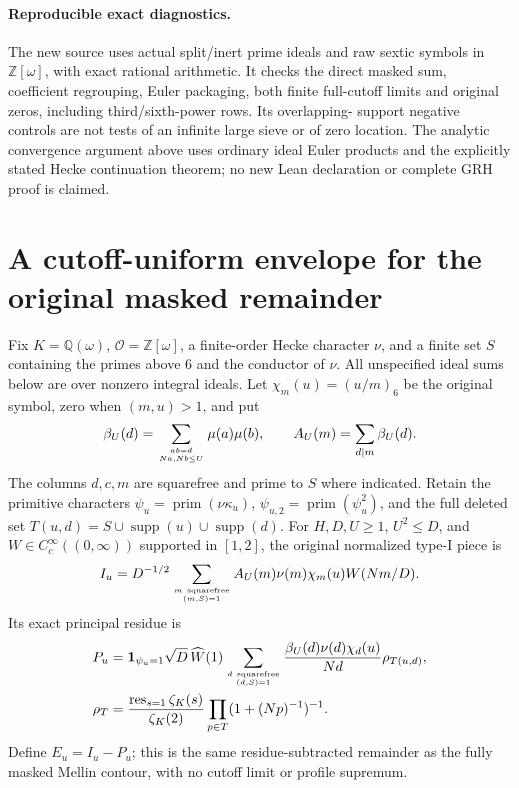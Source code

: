 \documentclass[11pt]{article}
\theoremstyle{definition}\newtheorem{definition}[theorem]{Definition}
\theoremstyle{remark}\newtheorem{remark}[theorem]{Remark}
\begin{document}
\paragraph{Reproducible exact diagnostics.}
The new source 
uses actual split/inert prime ideals and raw sextic symbols in
$\mathbb Z[\omega]$, with exact rational arithmetic. It checks the direct
masked sum, coefficient regrouping, Euler packaging, both finite full-cutoff
limits and original zeros, including third/sixth-power rows. Its overlapping-
support negative controls are not tests of an infinite large sieve or of
zero location. The analytic convergence argument above uses ordinary ideal
Euler products and the explicitly stated Hecke continuation theorem; no
new Lean declaration or complete GRH proof is claimed.

\section{A cutoff-uniform envelope for the original masked remainder}
\label{wc:core}
Fix $K=\mathbb Q(\omega)$, $\mathcal O=\mathbb Z[\omega]$, a finite-order
Hecke character $\nu$, and a finite set $S$ containing the primes above $6$
and the conductor of $\nu$. All unspecified ideal sums below are over
nonzero integral ideals. Let $\chi_m(u)=(u/m)_6$ be the original symbol,
zero when $(m,u)>1$, and put
\[
 \beta_U(d)=\sum_{ab=d\atop Na,Nb\le U}\mu(a)\mu(b),\qquad
 A_U(m)=\sum_{d\mid m}\beta_U(d).
\]
The columns $d,c,m$ are squarefree and prime to $S$ where indicated.
Retain the primitive characters $\psi_u=\operatorname{prim}(\nu\kappa_u)$,
$\psi_{u,2}=\operatorname{prim}(\psi_u^2)$, and the full deleted set
$T(u,d)=S\cup\operatorname{supp}(u)\cup\operatorname{supp}(d)$.
For $H,D,U\ge1$, $U^2\le D$, and $W\in C_c^\infty((0,\infty))$
supported in $[1,2]$, the original normalized type-I piece is
\begin{equation}\label{wc:polynomial}
 I_u=D^{-1/2}\sum_{m\ \mathrm{squarefree}\atop(m,S)=1}
     A_U(m)\nu(m)\chi_m(u)W(Nm/D).
\end{equation}
Its exact principal residue is
\begin{align}\label{wc:principal}
 P_u&=\mathbf1_{\psi_u=1}\sqrt D\,\widehat W(1)
 \sum_{d\ \mathrm{squarefree}\atop(d,S)=1}
 \frac{\beta_U(d)\nu(d)\chi_d(u)}{Nd}\rho_{T(u,d)},\notag\\
 \rho_T&=\frac{\operatorname*{res}_{s=1}\zeta_K(s)}{\zeta_K(2)}
               \prod_{p\in T}(1+(Np)^{-1})^{-1}.
\end{align}
Define $E_u=I_u-P_u$; this is the same residue-subtracted remainder as the
fully masked Mellin contour, with no cutoff limit or profile supremum.
\end{document}
